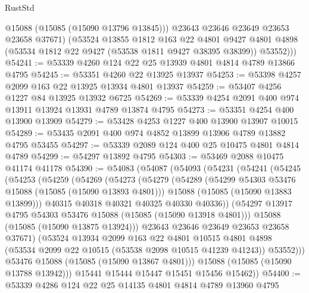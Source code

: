 \begin{lexlean}{RustStd}
\begin{coremodule}
            @15088
            (@15085 (@15090 @13796 @13845)))
          @23643
          @23646
          @23649
          @23653
          @23658
          @37671)
        (@53524
          @13855
          @1812
          @163
          @22
          @4801
          @9427
          @4801
          @4898
          (@53534 @1812 @22 @9427 (@53538 @1811 @9427 @38395 @38399))
          @53552)))
@54241 := @53339 @4260 @124 @22 @25 @13939 @4801 @4814 @4789 @13866 @4795
@54245 := @53351 @4260 @22 @13925 @13937
@54253 := @53398 @4257 @2099 @163 @22 @13925 @13934 @4801 @13937
@54259 := @53407 @4256 @1227 @84 @13925 @13932 @6725
@54269 := @53339 @4254 @2091 @400 @974 @13911 @13924 @13931 @4789 @13874 @4795
@54273 := @53351 @4254 @400 @13900 @13909
@54279 := @53428 @4253 @1227 @400 @13900 @13907 @10015
@54289 := @53435 @2091 @400 @974 @4852 @13899 @13906 @4789 @13882 @4795 @53455
@54297 := @53339 @2089 @124 @400 @25 @10475 @4801 @4814 @4789
@54299 := @54297 @13892 @4795
@54303 := @53469 @2088 @10475 @41174 @41178
@54390 := @54083
    (@54087
      (@54093
        (@54231
          (@54241
            (@54245
              (@54253
                (@54259
                  (@54269
                    (@54273
                      (@54279
                        (@54289
                          (@54299 @54303 @53476 @15088 (@15085 (@15090 @13893 @4801)))
                          @15088
                          (@15085 (@15090 @13883 @13899)))
                        @40315
                        @40318
                        @40321
                        @40325
                        @40330
                        @40336))
                    (@54297 @13917 @4795 @54303 @53476 @15088 (@15085 (@15090 @13918 @4801)))
                    @15088
                    (@15085 (@15090 @13875 @13924)))
                  @23643
                  @23646
                  @23649
                  @23653
                  @23658
                  @37671)
                (@53524
                  @13934
                  @2099
                  @163
                  @22
                  @4801
                  @10515
                  @4801
                  @4898
                  (@53534 @2099 @22 @10515 (@53538 @2098 @10515 @41239 @41243))
                  @53552)))
            @53476
            @15088
            (@15085 (@15090 @13867 @4801)))
          @15088
          (@15085 (@15090 @13788 @13942)))
        @15441
        @15444
        @15447
        @15451
        @15456
        @15462))
@54400 := @53339 @4286 @124 @22 @25 @14135 @4801 @4814 @4789 @13960 @4795

\end{coremodule}
\end{lexlean}
